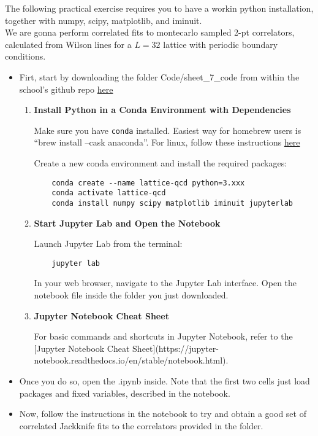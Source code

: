 The following practical exercise requires you to have a workin python installation, together with numpy, scipy, matplotlib, and iminuit.\\
We are gonna perform correlated fits to montecarlo sampled 2-pt correlators, calculated from Wilson lines for a $L=32$ lattice with periodic boundary conditions.\\
\begin{itemize}
\item Firt, start by downloading the folder Code/sheet\_7\_code from within the school's github repo \href{https://github.com/JointPhysicsAnalysisCenter/MTHS-Material/tree/lattice-instructions}{here}
\begin{enumerate}
    \item \textbf{Install Python in a Conda Environment with Dependencies}
    
    Make sure you have \texttt{conda} installed. Easiest way for homebrew users is ``brew install --cask anaconda''. For linux, follow these instructions \href{https://docs.conda.io/projects/conda/en/latest/user-guide/install/linux.html}{here}

    Create a new conda environment and install the required packages:
    \begin{verbatim}
    conda create --name lattice-qcd python=3.xxx
    conda activate lattice-qcd
    conda install numpy scipy matplotlib iminuit jupyterlab
    \end{verbatim}
    
    \item \textbf{Start Jupyter Lab and Open the Notebook}
    
    Launch Jupyter Lab from the terminal:
    \begin{verbatim}
    jupyter lab
    \end{verbatim}
    In your web browser, navigate to the Jupyter Lab interface. Open the notebook file inside the folder you just downloaded.
    
    \item \textbf{Jupyter Notebook Cheat Sheet}
    
    For basic commands and shortcuts in Jupyter Notebook, refer to the [Jupyter Notebook Cheat Sheet](https://jupyter-notebook.readthedocs.io/en/stable/notebook.html).
    \end{enumerate}
\item Once you do so, open the .ipynb inside. Note that the first two cells just load packages and fixed variables, described in the notebook.
\item Now, follow the instructions in the notebook to try and obtain a good set of correlated Jackknife fits to the correlators provided in the folder.
\end{itemize}
